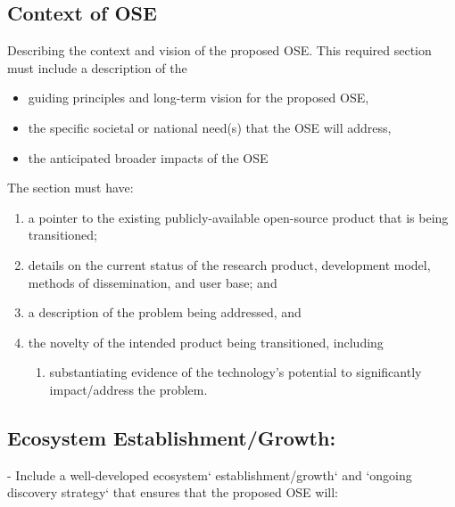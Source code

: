 
\subsection{Context of OSE}

Describing the context and vision of the proposed OSE. This required section must include a description of the 
\begin{itemize}
    \item guiding principles and long-term vision for the proposed OSE,
    \item the specific societal or national need(s) that the OSE will address,
    \item the anticipated broader impacts of the OSE 
\end{itemize}


The section must have:
\begin{enumerate}
\item a pointer to the existing publicly-available open-source product that is being transitioned;
\item details on the current status of the research product, development model, methods of dissemination, and user base; and
\item a description of the problem being addressed, and
\item the novelty of the intended product being transitioned, including 
\begin{enumerate}
\item substantiating evidence of the technology's potential to significantly impact/address the problem.
\end{enumerate}
\end{enumerate}


\subsection{Ecosystem Establishment/Growth:}
  - Include a well-developed ecosystem` establishment/growth` and `ongoing discovery strategy` that ensures that the proposed OSE will:
  
